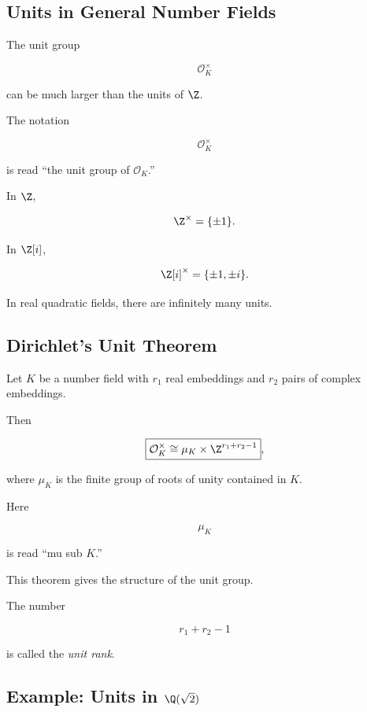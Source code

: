 \subsection{Units in General Number Fields}
\label{subsec:units-general-number-fields}

The unit group

\[ \mathcal O_K^\times \]

can be much larger than the units of \(\Z\).

The notation

\[ \mathcal O_K^\times \]

is read ``the unit group of \(\mathcal O_K\).''

In \(\Z\),

\[ \Z^\times=\{\pm1\}. \]

In \(\Z[i]\),

\[ \Z[i]^\times=\{\pm1,\pm i\}. \]

In real quadratic fields, there are infinitely many units.

\subsection{Dirichlet's Unit Theorem}
\label{subsec:dirichlet-unit-theorem}

\begin{theorem}
Let \(K\) be a number field with \(r_1\) real embeddings and \(r_2\) pairs of
complex embeddings.

Then

\[ \boxed{\mathcal O_K^\times\cong\mu_K\times\Z^{r_1+r_2-1}}, \]

where \(\mu_K\) is the finite group of roots of unity contained in \(K\).
\end{theorem}

Here

\[ \mu_K \]

is read ``mu sub \(K\).''

This theorem gives the structure of the unit group.

The number

\[ r_1+r_2-1 \]

is called the \emph{unit rank}.

\subsection{Example: Units in \(\Q(\sqrt2)\)}
\label{subsec:units-q-sqrt2}


